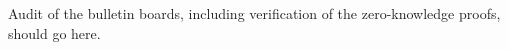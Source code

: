 Audit of the bulletin boards, including verification of the zero-\/knowledge proofs, should go here. 